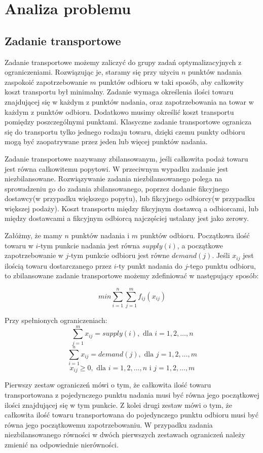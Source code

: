 \chapter{Analiza problemu}
\thispagestyle{chapterBeginStyle}
\label{rozdzial1}

\section{Zadanie transportowe}
Zadanie transportowe możemy zaliczyć do grupy zadań optymalizacyjnych z ograniczeniami. Rozwiązując je, staramy się przy użyciu $n$ punktów nadania 
zaspokoić zapotrzebowanie $m$ punktów odbioru w taki sposób, aby całkowity koszt transportu był minimalny. Zadanie wymaga określenia ilości 
towaru znajdującej się w każdym z punktów nadania, oraz zapotrzebowania na towar w każdym z punktów odbioru. Dodatkowo musimy określić 
koszt transportu pomiędzy poszczególnymi punktami. Klasyczne zadanie transportowe ogranicza się do transportu 
tylko jednego rodzaju towaru, dzięki czemu punkty odbioru mogą być zaopatrywane przez jeden lub więcej punktów nadania.

Zadanie transportowe nazywamy zbilansowanym, jeśli całkowita podaż towaru jest równa całkowitemu popytowi. W przeciwnym wypadku 
zadanie jest niezbilansowane. Rozwiązywanie zadania niezbilansowanego polega na sprowadzeniu go do zadania zbilansowanego, poprzez 
dodanie fikcyjnego dostawcy(w przypadku większego popytu), lub fikcyjnego odbiorcy(w przypadku większej podaży). Koszt transportu 
między fikcyjnym dostawcą a odbiorcami, lub między dostawcami a fikcyjnym odbiorcą najczęściej ustalany jest jako zerowy.

Załóżmy, że mamy $n$ punktów nadania i $m$ punktów odbioru. Początkowa ilość towaru w $i$-tym punkcie nadania jest równa $supply(i)$, 
a początkowe zapotrzebowanie w $j$-tym punkcie odbioru jest równe $demand(j)$. Jeśli $x_{ij}$ jest ilością towaru dostarczanego przez 
$i$-ty punkt nadania do $j$-tego punktu odbioru, to zbilansowane zadanie transportowe możemy zdefiniować w następujący sposób:

$$min \sum_{i=1}^{n} \sum_{j=1}^{m} f_{ij}(x_{ij})$$

Przy spełnionych ograniczeniach:
$$\sum_{j=1}^{m} x_{ij} = supply(i), \text{ dla } i = 1, 2, \dots, n$$
$$\sum_{i=1}^{n} x_{ij} = demand(j), \text{ dla } j = 1, 2, \dots, m$$
$$x_{ij} \ge 0, \text{ dla } i = 1, 2, \dots, n \text{ i } j = 1, 2, \dots, m$$

Pierwszy zestaw ograniczeń mówi o tym, że całkowita ilość towaru transportowana z pojedynczego punktu nadania musi być równa jego początkowej 
ilości znajdującej się w tym punkcie. Z kolei drugi zestaw mówi o tym, że całkowita ilość towaru transportowana do pojedynczego punktu odbioru 
musi być równa jego początkowemu zapotrzebowaniu. W przypadku zadania niezbilansowanego równości w dwóch pierwszych zestawach ograniczeń należy 
zmienić na odpowiednie nierówności. 


